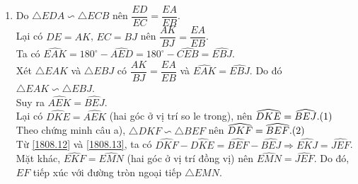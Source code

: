 \begin{ex}
{\begin{enumerate}
				\\ Do $BECJ$ là hình bình hành nên $N$ cũng là trung điểm $EJ$. Tương tự $M$ cũng là trung điểm $EK$.
				\\ $\triangle EFJ$ có $P,N$ là trung điểm của $EF,EJ$ nên $NP \parallel JF. \refstepcounter{equation}\hfill (\theequation)\label{1808.10}$
				\\ $\triangle EKJ$ có $M,N$ là trung điểm của $EK, EJ$ nên $MN \parallel KJ. \refstepcounter{equation}\hfill (\theequation)\label{1808.11}$
				\\ Từ \eqref{1808.10} và \eqref{1808.11}, ta có $M,N,P$ thẳng hàng. 
				\\ Vậy $MN$ đi qua trung điểm của đoạn $EF$.
				\item Do $\triangle EDA \backsim \triangle ECB$ nên $\dfrac{ED}{EC} =\dfrac{EA}{EB}$. \\
				Lại có $DE=AK$, $EC=BJ$ nên $\dfrac{AK}{BJ}= \dfrac{EA}{EB}$.\\
				Ta có $\widehat{EAK} =180^\circ - \widehat{AED} = 180^\circ - \widehat{CEB} = \widehat{EBJ}$.
				\\ Xét $\triangle EAK$ và $\triangle EBJ$ có $\dfrac{AK}{BJ} = \dfrac{EA}{EB}$ và $\widehat{EAK}= \widehat{EBJ}$. Do đó $\triangle EAK \backsim \triangle EBJ$.
				\\ Suy ra $\widehat{AEK} =\widehat{BEJ}$. 
				\\ Lại có $\widehat{DKE} = \widehat{AEK}$ (hai góc ở vị trí so le trong), nên $\widehat{DKE} =\widehat{BEJ}. \refstepcounter{equation}\hfill (\theequation)\label{1808.12}$
				\\ Theo chứng minh câu a), $\triangle DKF \backsim \triangle BEF$ nên $\widehat{DKF} =\widehat{BEF}. \refstepcounter{equation}\hfill (\theequation)\label{1808.13}$
				\\ Từ \eqref{1808.12} và \eqref{1808.13}, ta có $\widehat{DKF} - \widehat{DKE} =\widehat{BEF} -\widehat{BEJ} \Rightarrow \widehat{EKJ} =\widehat{JEF}$.
				\\ Mặt khác, $\widehat{EKF} =\widehat{EMN}$ (hai góc ở vị trí đồng vị) nên $\widehat{EMN} =\widehat{JEF}$. Do đó, $EF$ tiếp xúc với đường tròn ngoại tiếp $\triangle EMN$.
			\end{enumerate}
		}
	\end{ex}
	
